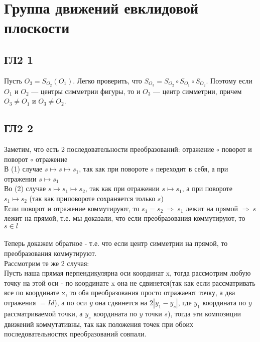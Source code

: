 \newpage
	\section{Группа движений евклидовой плоскости}
		
		\subsection{ГЛ2 1}		
		Пусть $O_3 = S_{O_2}(O_1)$. Легко проверить, что $S_{O_3} = S_{O_2} \circ S_{O_1} \circ S_{O_2}$. Поэтому если $O_1$ и $O_2$ — центры симметрии фигуры, то и $O_3$ — центр симметрии, причем $O_3 \ne O_1$ и $O_3 \ne O_2$.\\
		
		\subsection{ГЛ2 2}		
		Заметим, что есть 2 последовательности преобразований: отражение $\circ$ поворот и поворот $\circ$ отражение\\
		В (1) случае $s \mapsto s \mapsto s_1$, так как при повороте $s$ переходит в себя, а при отражении $s \mapsto s_1$\\
		Во (2) случае $s \mapsto s_1 \mapsto s_2$, так как при отражении $s \mapsto s_1$, а при повороте $s_1 \mapsto s_2$ (так как приповороте сохраняется только $s$)\\
		Если поворот и отражение коммутируют, то $s_1 = s_2 \: \Rightarrow \: s_1$ лежит на прямой $\Rightarrow \: s$ лежит на прямой, т.е. мы доказали, что если преобразования коммутируют, то $s \in l$\\
		\\
		Теперь докажем обратное - т.е. что если центр симметрии на прямой, то преобразования коммутируют.\\
		Рассмотрим те же 2 случая:\\
		Пусть наша прямая перпендикулярна оси координат x, тогда рассмотрим любую точку на этой оси - по координате x она не сдвинется(так как если рассматривать все по координате x, то оба преобразования просто отражаеют точку, а два отражения $= Id$), а по оси $y$ она сдвинется на $2|y_1 - y_s|$, где $y_1$ координата по $y$ рассматриваемой точки, а $y_s$ координата по $y$ точки $s$), тогда эти композиции движений коммутативны, так как положения точек при обоих последовательностях преобразований совпали.
		
